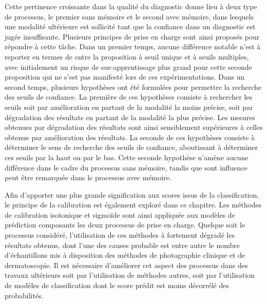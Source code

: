 Cette pertinence croissante dans la qualité du diagnostic donne lieu à deux type de processus, le premier sans mémoire et le second avec mémoire, dans lesquels une modalité ultérieure est sollicité tant que la confiance dans un diagnostic est jugée insuffisante. Plusieurs principes de prise en charge sont ainsi proposés pour répondre à cette tâche. Dans un premier temps, aucune différence notable n'est à reporter en termes de \fscore{} entre la proposition à seuil unique et à seuils multiples, avec initialement un risque de sur-apprentissage plus grand pour cette seconde proposition qui ne s'est pas manifesté lors de ces expérimentations. Dans un second temps, plusieurs hypothèses ont été formulées pour permettre la recherche des seuils de confiance. La première de ces hypothèses consiste à rechercher les seuils soit par amélioration en partant de la modalité la moins précise, soit par dégradation des résultats en partant de la modalité la plus précise. Les mesures obtenues par dégradation des résultats sont ainsi sensiblement supérieures à celles obtenue par amélioration des résultats. La seconde de ces hypothèses consiste à déterminer le sens de recherche des seuils de confiance, aboutissant à déterminer ces seuils par la haut ou par le bas. Cette seconde hypothèse n'amène aucune différence dans le cadre du processus sans mémoire, tandis que sont influence peut être remarquée dans le processus avec mémoire.\par

Afin d'apporter une plus grande signification aux scores issus de la classification, le principe de la calibration est également exploré dans ce chapitre. Les méthodes de calibration isotonique et sigmoïde sont ainsi appliquée aux modèles de prédiction composants les deux processus de prise en charge. Quelque soit le processus considéré, l'utilisation de ces méthodes à fortement dégradé les résultats obtenus, dont l'une des causes probable est entre autre le nombre d'échantillons mis à disposition des méthodes de photographie clinique et de dermatoscopie. Il est nécessaire d'améliorer cet aspect des processus dans des travaux ultérieurs soit par l'utilisation de méthodes autres, soit par l'utilisation de modèles de classification dont le score prédit est moins décorrélé des probabilités.\par

